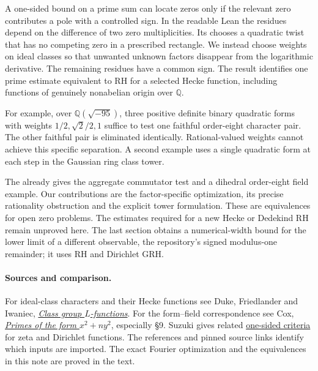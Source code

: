 \documentclass[11pt]{article}
\begin{document}
A one-sided bound on a prime sum can locate zeros only if the relevant
zero contributes a pole with a controlled sign. In the readable Lean
the residues depend on the difference of two zero multiplicities.
Its 
chooses a quadratic twist that has no competing zero in a prescribed
rectangle. We instead choose weights on ideal classes so that unwanted
unknown factors disappear from the logarithmic derivative. The remaining
residues have a common sign. The result identifies one prime estimate
equivalent to RH for a selected Hecke function, including functions of
genuinely nonabelian origin over $\mathbb Q$.

For example, over $\mathbb Q(\sqrt{-95})$, three positive definite
binary quadratic forms with weights $1/2,\sqrt{2}/2,1$ suffice to test
one faithful order-eight character pair. The other faithful pair is
eliminated identically. Rational-valued weights cannot achieve this
specific separation. A second example uses a single quadratic form at
each step in the Gaussian ring class tower.

The  already gives the aggregate commutator test and a
dihedral order-eight field example. Our contributions are the
factor-specific optimization, its precise rationality obstruction and
the explicit tower formulation. These are equivalences for open zero
problems. The estimates required for a new Hecke or Dedekind RH remain
unproved here. The last section obtains a numerical-width bound for the
lower limit of a different observable, the repository's signed
modulus-one remainder; it uses RH and Dirichlet GRH.





\paragraph{Sources and comparison.} For ideal-class characters and
their Hecke functions see Duke, Friedlander and Iwaniec,
\href{https://www.math.ucla.edu/~wdduke/preprints/classgroup.pdf}{\emph{Class
group $L$-functions}}. For the form--field correspondence see Cox,
\href{https://www.math.utoronto.ca/~ila/Cox-Primes_of_the_form_x2%2Bny2.pdf}{\emph{Primes
of the form $x^2+ny^2$}}, especially \S9. Suzuki gives related
\href{https://doi.org/10.1007/s11139-025-01238-9}{one-sided criteria}
for zeta and Dirichlet functions. The references and pinned source
links identify which inputs are imported. The exact Fourier
optimization and the equivalences in this note are proved in the text.
\end{document}
